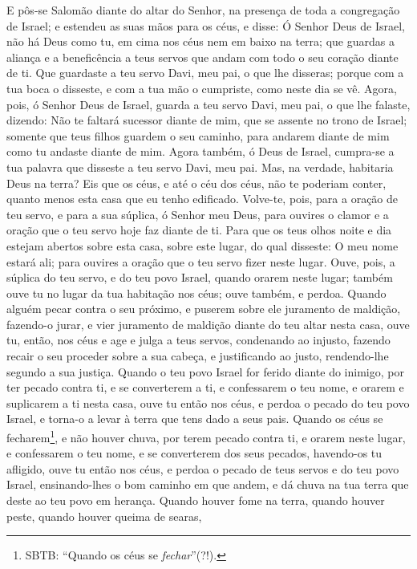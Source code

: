 E pôs-se Salomão diante do altar do Senhor, na presença de toda a
congregação de Israel; e estendeu as suas mãos para os céus,
e disse: Ó Senhor Deus de Israel, não há Deus como tu, em
cima nos céus nem em baixo na terra; que guardas a aliança e a
beneficência a teus servos que andam com todo o seu coração diante
de ti. Que guardaste a teu servo Davi, meu pai, o que lhe
disseras; porque com a tua boca o disseste, e com a tua mão o
cumpriste, como neste dia se vê. Agora, pois, ó Senhor Deus
de Israel, guarda a teu servo Davi, meu pai, o que lhe falaste,
dizendo: Não te faltará sucessor diante de mim, que se assente no
trono de Israel; somente que teus filhos guardem o seu caminho, para
andarem diante de mim como tu andaste diante de mim. Agora
também, ó Deus de Israel, cumpra-se a tua palavra que disseste a teu
servo Davi, meu pai. Mas, na verdade, habitaria Deus na
terra? Eis que os céus, e até o céu dos céus, não te poderiam
conter, quanto menos esta casa que eu tenho edificado.
Volve-te, pois, para a oração de teu servo, e para a sua
súplica, ó Senhor meu Deus, para ouvires o clamor e a oração que o
teu servo hoje faz diante de ti. Para que os teus olhos noite
e dia estejam abertos sobre esta casa, sobre este lugar, do qual
disseste: O meu nome estará ali; para ouvires a oração que o teu
servo fizer neste lugar. Ouve, pois, a súplica do teu servo,
e do teu povo Israel, quando orarem neste lugar; também ouve tu no
lugar da tua habitação nos céus; ouve também, e perdoa.
Quando alguém pecar contra o seu próximo, e puserem sobre ele
juramento de maldição, fazendo-o jurar, e vier juramento de maldição
diante do teu altar nesta casa, ouve tu, então, nos céus e
age e julga a teus servos, condenando ao injusto, fazendo recair o
seu proceder sobre a sua cabeça, e justificando ao justo,
rendendo-lhe segundo a sua justiça. Quando o teu povo Israel
for ferido diante do inimigo, por ter pecado contra ti, e se
converterem a ti, e confessarem o teu nome, e orarem e suplicarem a
ti nesta casa, ouve tu então nos céus, e perdoa o pecado do
teu povo Israel, e torna-o a levar à terra que tens dado a seus
pais. Quando os céus se fecharem\footnote{SBTB: ``Quando os
céus se \emph{fechar}''(?!).}, e não houver chuva, por terem pecado
contra ti, e orarem neste lugar, e confessarem o teu nome, e se
converterem dos seus pecados, havendo-os tu afligido, ouve tu
então nos céus, e perdoa o pecado de teus servos e do teu povo
Israel, ensinando-lhes o bom caminho em que andem, e dá chuva na tua
terra que deste ao teu povo em herança. Quando houver fome na
terra, quando houver peste, quando houver queima de searas,
